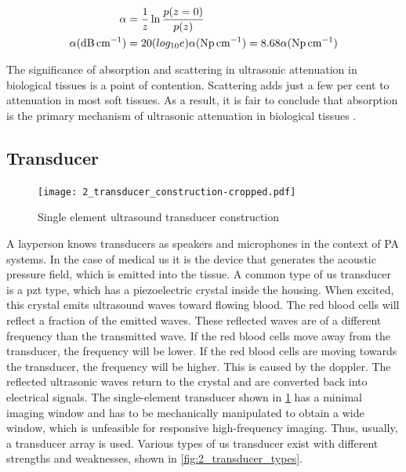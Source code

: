 \begin{subequations} \label{eq:2_attenuation_coefficient}
	\begin{align}
		\ensuremath{\alpha &= \frac{1}{z} \ln \frac{p(z=0)}{p(z)} \\
		\alpha( \si{\dB\per\centi\meter} ) &= 20 ( log_{10}e) \alpha ( \si{\neper\per\centi\meter}) = 8.68\alpha (\si{\neper\per\centi\meter})}
	\end{align}
\end{subequations}

The significance of absorption and scattering in ultrasonic attenuation in biological tissues is a point of contention. Scattering adds just a few per cent to attenuation in most soft tissues. As a result, it is fair to conclude that absorption is the primary mechanism of ultrasonic attenuation in biological tissues \cite{ShungUltrasound_Book}.

\subsection{Transducer}

\begin{figure}[htbp]
	\centering
	\texttt{[image: 2\_transducer\_construction-cropped.pdf]}
	\caption[Single element ultrasound transducer construction]{Single element ultrasound transducer construction \cite{JensenUltrasoundBook}}
	\label{fig:2_transducer_construction}
\end{figure}

A layperson knows transducers as speakers and microphones in the context of PA systems. In the case of medical \gls{us} it is the device that generates the acoustic pressure field, which is emitted into the tissue. A common type of \gls{us} transducer is a \gls{pzt} type, which has a piezoelectric crystal inside the housing. When excited, this crystal emits ultrasound waves toward flowing blood. The red blood cells will reflect a fraction of the emitted waves. These reflected waves are of a different frequency than the transmitted wave. If the red blood cells move away from the transducer, the frequency will be lower. If the red blood cells are moving towards the transducer, the frequency will be higher. This is caused by the \gls{doppler}. The reflected ultrasonic waves return to the crystal and are converted back into electrical signals. The single-element transducer shown in \cref{fig:2_transducer_construction} has a minimal imaging window and has to be mechanically manipulated to obtain a wide window, which is unfeasible for responsive high-frequency imaging. Thus, usually, a transducer array is used. Various types of \gls{us} transducer exist with different strengths and weaknesses, shown in \cref{fig:2_transducer_types}.

